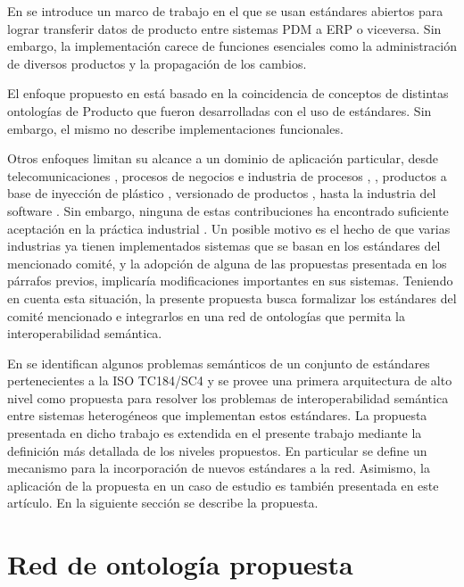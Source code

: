 \documentclass[journal]{IEEEtran}
\begin{document}
En \cite{Paviot2011h} se introduce un marco de trabajo en el que se usan est\'andares abiertos para lograr transferir datos de producto entre sistemas PDM a ERP o viceversa. Sin embargo, la implementaci\'on carece de funciones esenciales como la administraci\'on de diversos productos y la propagaci\'on de los cambios. 

El enfoque propuesto en \cite{Tursi2009} est\'a basado en la coincidencia de conceptos de distintas ontolog\'ias de Producto que fueron desarrolladas con el uso de est\'andares. Sin embargo, el mismo no describe implementaciones funcionales.

Otros enfoques limitan su alcance a un dominio de aplicaci\'on particular, desde telecomunicaciones \cite{10.1007/978-3-319-73450-7_73}, procesos de negocios \cite{Silega2014} e industria de procesos \cite{JonAtleGulla}, \cite{Marquardt2010}, productos a base de inyección de plástico \cite{CurideMouraLeite201713}, versionado de productos \cite{Sonzini2016UnaProducto}, hasta la industria del software \cite{Isotani2015}. Sin embargo, ninguna de estas contribuciones ha encontrado suficiente aceptaci\'on en la pr\'actica industrial \cite{Wiesner2011}.  Un posible motivo es el hecho de que varias industrias ya tienen implementados sistemas que se basan en los est\'andares del mencionado comit\'e, y la adopci\'on de alguna de las propuestas presentada en los p\'arrafos previos, implicar\'ia modificaciones importantes en sus sistemas.  Teniendo en cuenta esta situaci\'on, la presente propuesta busca formalizar los est\'andares del comit\'e mencionado e integrarlos en una red de ontolog\'ias que permita la interoperabilidad sem\'antica. 

En \cite{Fraga} se identifican algunos problemas sem\'anticos de un conjunto de est\'andares pertenecientes a la ISO TC184/SC4 y se provee una primera arquitectura de alto nivel como propuesta para resolver los problemas de interoperabilidad sem\'antica entre sistemas heterog\'eneos que implementan estos est\'andares. La propuesta presentada en dicho trabajo es extendida en el presente trabajo mediante la definici\'on m\'as detallada de los niveles propuestos. En particular se define un mecanismo para la incorporaci\'on de nuevos est\'andares a la red. Asimismo, la aplicaci\'on de la propuesta en un caso de estudio es tambi\'en presentada en este art\'iculo. En la siguiente secci\'on se describe la propuesta.


\section{Red de ontolog\'ia propuesta}
\end{document}
